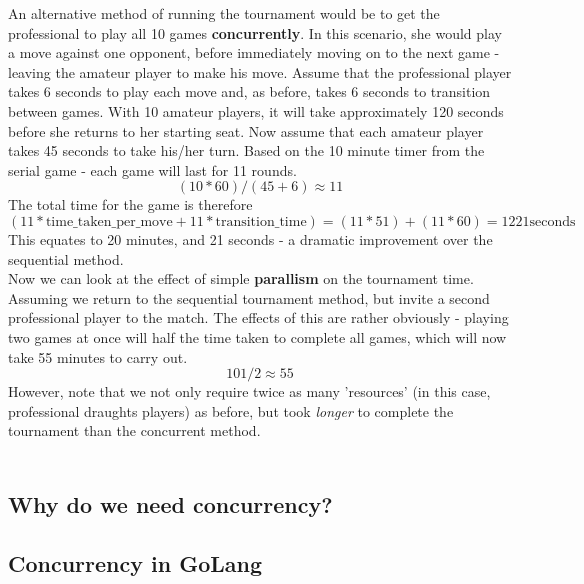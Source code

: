 An alternative method of running the tournament would be to get the professional
to play all 10 games \textbf{concurrently}. In this scenario, she would play
a move against one opponent, before immediately moving on to the next game -
leaving the amateur player to make his move. Assume that the professional player
takes 6 seconds to play each move and, as before, takes 6 seconds to transition
between games. With 10 amateur players, it will take approximately 120 seconds
before she returns to her starting seat. Now assume that each amateur player
takes 45 seconds to take his/her turn. Based on the 10 minute timer from the
serial game - each game will last for 11 rounds.
$$(10 * 60) / (45 + 6) \approx 11$$
The total time for the game is therefore
$$(11 * \text{time\_taken\_per\_move} + 11 * \text{transition\_time}) = (11 * 51) + (11 * 60) = 1221 \text{seconds}$$
This equates to 20 minutes, and 21 seconds - a dramatic improvement over the
sequential method. \\

Now we can look at the effect of simple \textbf{parallism} on the tournament
time. Assuming we return to the sequential tournament method, but invite a
second professional player to the match. The effects of this are rather
obviously - playing two games at once will half the time taken to complete all
games, which will now take 55 minutes to carry out. $$101/2 \approx 55$$
However, note that we not only require twice as many 'resources' (in this case,
professional draughts players) as before, but took \emph{longer} to complete the
tournament than the concurrent method. \\

 \\


\subsection{Why do we need concurrency?}
\label{sub:Why do we need parallism}


\subsection{Concurrency in GoLang}
\label{sub:golangConcurrency}

